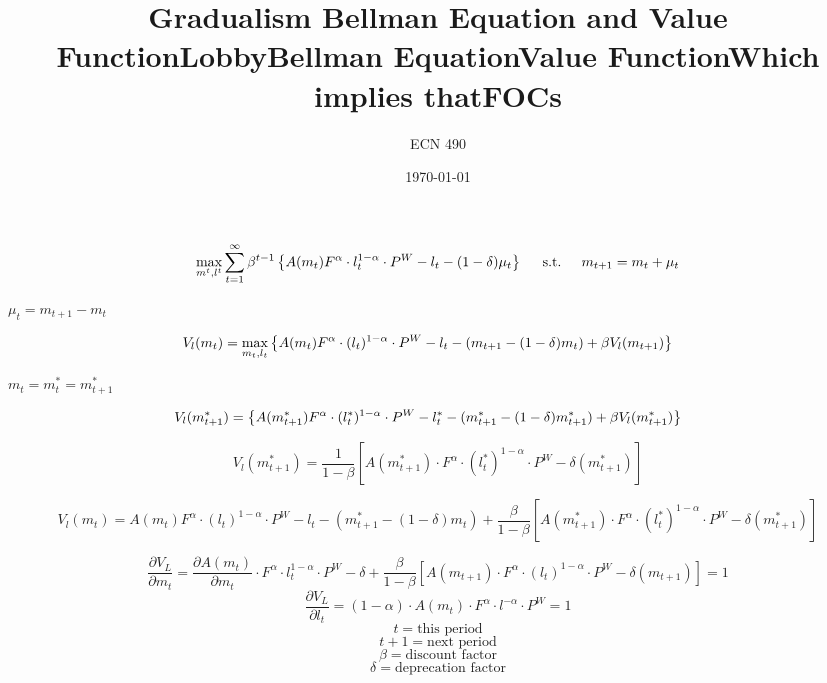 \documentclass[12pt]{article}
\begin{document}
\title{\vskip-0.6in Gradualism Bellman Equation and Value Function}
\author{ECN 490}
\date{\today}
\maketitle

\title{Lobby}
\[
\max_{m^t,l^t} \sum_{t=1}^\infty \beta^{t-1}\left\{A(m_t)F^\alpha\cdot l^{1-\alpha}_t\cdot P^W-l_t-(1-\delta)\mu_t
  \right\} \hskip.2in \text{s.t.} \hskip.2in  m_{t+1}=m_{t}+\mu_t
\]
\begin{center} $\mu_t=m_{t+1}-m_{t}$\end{center}

\title{Bellman Equation}
\[
  V_l(m_t)=\max_{m_t,l_t}\left\{A(m_t)F^\alpha\cdot (l_t)^{1-\alpha}\cdot P^W-l_t-(m_{t+1}-(1-\delta)m_t)+\beta V_l(m_{t+1})
  \right\} \hskip.2in 
\]
\begin{center} $m_t=m_t^\ast=m^\ast_{t+1}$\end{center}
\title{Value Function}
\[
  V_l(m_{t+1}^\ast)=\left\{A(m_{t+1}^\ast)F^\alpha\cdot (l^\ast_t)^{1-\alpha}\cdot P^W-l_t^\ast-(m^\ast_{t+1}-(1-\delta)m^\ast_{t+1})+\beta V_l(m^\ast_{t+1})
 \right\} \hskip.2in
\]
\begin{center}\title{Which implies that}\end{center}
\[V_l(m_{t+1}^\ast)=\frac{1}{1-\beta}[A(m_{t+1}^\ast)\cdot F^\alpha\cdot (l^\ast_t)^{1-\alpha}\cdot P^W-\delta(m^\ast_{t+1})]\]
\begin{center}\end{center}
\[
  V_l(m_t)=A(m_t)F^\alpha\cdot (l_t)^{1-\alpha}\cdot P^W-l_t-(m^\ast_{t+1}-(1-\delta)m_t)+\frac{\beta}{1-\beta}[A(m_{t+1}^\ast)\cdot F^\alpha\cdot (l^\ast_t)^{1-\alpha}\cdot P^W-\delta(m^\ast_{t+1})] 
\]
\title{FOCs}
\[\frac{\partial V_L}{\partial m_t}=\frac{\partial A(m_t)}{\partial m_t} \cdot F^\alpha \cdot l^{1-\alpha}_t \cdot P^W-\delta+\frac{\beta}{1-\beta}[A(m_{t+1})\cdot F^\alpha\cdot (l_t)^{1-\alpha}\cdot P^W-\delta(m_{t+1})]=1
\]
\[
\frac{\partial V_L}{\partial l_t}= (1-\alpha) \cdot A(m_t) \cdot F^\alpha \cdot l^{-\alpha} \cdot P^W =1
\]
\[
t=\text{this period}
\]
\[
t+1=\text{next period}
\]
\[
\beta=\text{discount factor}
\]
\[
\delta=\text{deprecation factor}
\]
\end{document}
